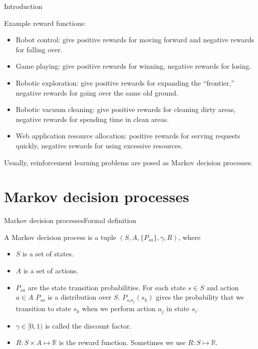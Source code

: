 \documentclass{beamer}
\def\Rset{\mathbb{R}}
\begin{document}
\begin{frame}{Introduction}

  Example reward functions:
  \begin{itemize}
    \item Robot control: give positive rewards for moving forward and
      negative rewards for falling over.
    \item Game playing: give positive rewards for winning, negative
      rewards for losing.
    \item Robotic exploration: give positive rewards for expanding
      the ``frontier,'' negative rewards for going over the same old
      ground.
    \item Robotic vacuum cleaning: give positive rewards for cleaning
      dirty areas, negative rewards for spending time in clean areas.
    \item Web application resource allocation: positive rewards for
      serving requests quickly, negative rewards for using excessive
      resources.
  \end{itemize}

  \medskip

  Usually, reinforcement learning problems are posed as \alert{Markov
    decision processes}.
  
\end{frame}

\section{Markov decision processes}

\begin{frame}{Markov decision processes}{Formal definition}

  A Markov decision process is a tuple $(S, A, \{P_{sa}\}, \gamma, R)$,
  where
  \begin{itemize}
  \item $S$ is a set of \alert{states}.
  \item $A$ is a set of \alert{actions}.
  \item $P_{sa}$ are the \alert{state transition probabilities}. For
    each state $s \in S$ and action $a \in A$ $P_{sa}$ is a
    distribution over $S$. $P_{s_ia_j}(s_k)$ gives the probability
    that we transition to state $s_k$ when we perform action $a_j$ in
    state $s_i$.
  \item $\gamma \in [0,1)$ is called the \alert{discount factor}.
  \item $R : S \times A \mapsto \Rset$ is the \alert{reward function}.
    Sometimes we use $R : S \mapsto \Rset$.
  \end{itemize}
  
\end{frame}
\end{document}
